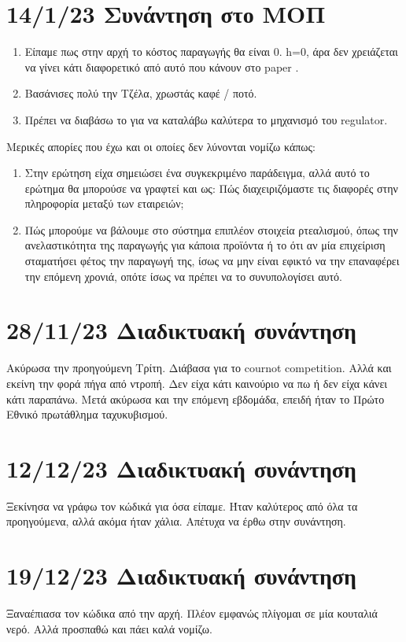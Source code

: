 \documentclass[a4paper,twoside,10pt]{article}
\begin{document}
\section{14/1/23 Συνάντηση στο ΜΟΠ}
\begin{enumerate}
	\item Είπαμε πως στην αρχή το κόστος παραγωγής θα είναι 0. h=0, άρα δεν χρειάζεται να γίνει κάτι διαφορετικό από αυτό που κάνουν στο paper \cite{Allocating}.
	\item Βασάνισες πολύ την Τζέλα, χρωστάς καφέ / ποτό.
	\item Πρέπει να διαβάσω το \cite{Allocating} για να καταλάβω καλύτερα το μηχανισμό του regulator. 
\end{enumerate}  

Μερικές απορίες που έχω και οι οποίες δεν λύνονται νομίζω κάπως:
\begin{enumerate}
	\item Στην ερώτηση είχα σημειώσει ένα συγκεκριμένο παράδειγμα, αλλά αυτό το ερώτημα θα μπορούσε να γραφτεί και ως: Πώς διαχειριζόμαστε τις διαφορές στην πληροφορία μεταξύ των εταιρειών;
	\item Πώς μπορούμε να βάλουμε στο σύστημα επιπλέον στοιχεία ρτεαλισμού, όπως την ανελαστικότητα της παραγωγής για κάποια προϊόντα ή το ότι αν μία επιχείριση σταματήσει φέτος την παραγωγή της, ίσως να μην είναι εφικτό να την επαναφέρει την επόμενη χρονιά, οπότε ίσως να πρέπει να το συνυπολογίσει αυτό.

\end{enumerate} 

\section{28/11/23 Διαδικτυακή συνάντηση}
Ακύρωσα την προηγούμενη Τρίτη. 
Διάβασα για το cournot competition.
Αλλά και εκείνη την φορά πήγα από ντροπή. Δεν είχα κάτι καινούριο να πω ή δεν είχα κάνει κάτι παραπάνω.
Μετά ακύρωσα και την επόμενη εβδομάδα, επειδή ήταν το Πρώτο Εθνικό πρωτάθλημα ταχυκυβισμού. 


\section{12/12/23 Διαδικτυακή συνάντηση}
Ξεκίνησα να γράφω τον κώδικά για όσα είπαμε. Ήταν καλύτερος από όλα τα προηγούμενα, αλλά ακόμα ήταν χάλια. Απέτυχα να έρθω στην συνάντηση.


\section{19/12/23 Διαδικτυακή συνάντηση}
Ξαναέπιασα τον κώδικα από την αρχή. Πλέον εμφανώς πλίγομαι σε μία κουταλιά νερό. Αλλά προσπαθώ και πάει καλά νομίζω.
\end{document}

